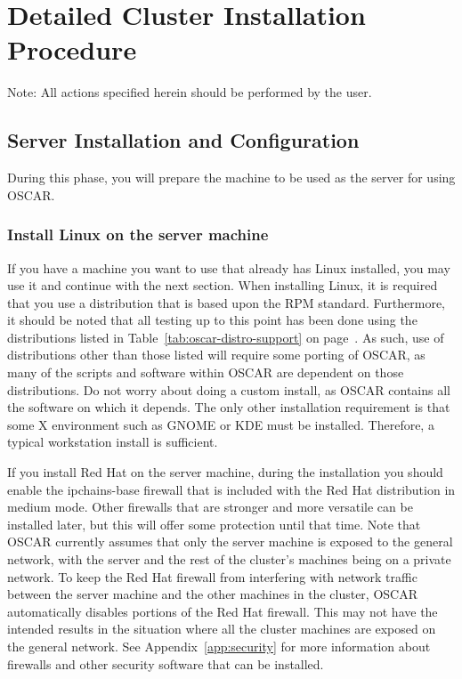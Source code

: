 %
%
%

\section{Detailed Cluster Installation Procedure}
\label{det:top}

Note: All actions specified herein should be performed by the
 user.


\subsection{Server Installation and Configuration}
\label{det:serverinstall}
  
During this phase, you will prepare the machine to be used as the
server for using OSCAR.

\subsubsection{Install Linux on the server machine} 
\label{det:serverosinstall}

If you have a machine you want to use that already has Linux
installed, you may use it and continue with the next section. When
installing Linux, it is required that you use a distribution that is
based upon the RPM standard.  Furthermore, it should be noted that all
testing up to this point has been done using the distributions listed
in Table~\ref{tab:oscar-distro-support} on
page~\pageref{tab:oscar-distro-support}.  As such, use of
distributions other than those listed will require some porting of
OSCAR, as many of the scripts and software within OSCAR are dependent
on those distributions. Do not worry about doing a custom install, as
OSCAR contains all the software on which it depends.  The only other
installation requirement is that some X environment such as GNOME or
KDE must be installed. Therefore, a typical workstation install is
sufficient.

If you install Red Hat on the server machine, during the
installation you should enable the ipchains-base firewall that is
included with the Red Hat distribution in medium mode.  Other
firewalls that are stronger and more versatile can be installed later,
but this will offer some protection until that time.  Note that OSCAR
currently assumes that only the server machine is exposed to the
general network, with the server and the rest of the cluster's
machines being on a private network. To keep the Red Hat firewall from
interfering with network traffic between the server machine and the
other machines in the cluster, OSCAR automatically disables portions
of the Red Hat firewall. This may not have the intended results in the
situation where all the cluster machines are exposed on the general
network.  See Appendix~\ref{app:security} for more information about
firewalls and other security software that can be installed.

